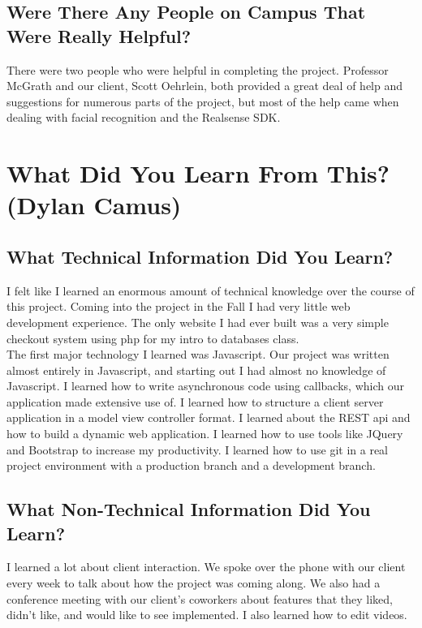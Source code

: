 \documentclass[10pt, onecolumn, twoside, peerreview]{IEEEtran}
\begin{document}
\subsection{Were There Any People on Campus That Were Really Helpful?}
There were two people who were helpful in completing the project. Professor McGrath and our client, Scott Oehrlein, both provided a great deal of help and suggestions for numerous parts of the project, but most of the help came when dealing with facial recognition and the Realsense SDK.

\section{What Did You Learn From This? (Dylan Camus)}
\subsection{What Technical Information Did You Learn?}
I felt like I learned an enormous amount of technical knowledge over the course of this project. Coming into the project in the Fall I had very little web development experience. The only website I had ever built was a very simple checkout system using php for my intro to databases class.\\

The first major technology I learned was Javascript. Our project was written almost entirely in Javascript, and starting out I had almost no knowledge of Javascript. I learned how to write asynchronous code using callbacks, which our application made extensive use of. I learned how to structure a client server application in a model view controller format. I learned about the REST api and how to build a dynamic web application. I learned how to use tools like JQuery and Bootstrap to increase my productivity. I learned how to use git in a real project environment with a production branch and a development branch.

\subsection{What Non-Technical Information Did You Learn?}
I learned a lot about client interaction. We spoke over the phone with our client every week to talk about how the project was coming along. We also had a conference meeting with our client's coworkers about features that they liked, didn't like, and would like to see implemented. I also learned how to edit videos.
\end{document}
